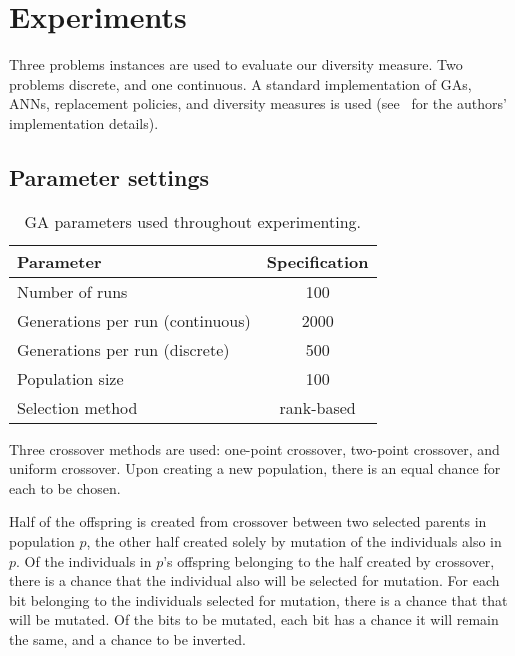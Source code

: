 \section{Experiments}
Three problems instances are used to evaluate our diversity measure. Two problems discrete, and one continuous. A standard implementation of GAs, ANNs, replacement policies, and diversity measures is used (see~\cite{mbm:kmc:ekoGA} for the authors' implementation details). 

\subsection{Parameter settings}

\begin{table}
  \centering
  \begin{tabular}{l S}
    \toprule
    Parameter & {Specification} \\
    \midrule
    Number of runs & 100 \\
    Generations per run (continuous) & 2000 \\
    Generations per run (discrete) & 500 \\
    Population size & 100 \\
    Selection method & {rank-based} \\
    \bottomrule
  \end{tabular}
  \caption{GA parameters used throughout experimenting.}
  \label{tab:gaparam}
\end{table}

Three crossover methods are used: one-point crossover, two-point crossover, and uniform crossover. Upon creating a new population, there is an equal chance for each to be chosen.

Half of the offspring is created from crossover between two selected parents in population $p$, the other half created solely by mutation of the individuals also in $p$. Of the individuals in $p$'s offspring belonging to the half created by crossover, there is a  chance that the individual also will be selected for mutation. For each bit belonging to the individuals selected for mutation, there is a  chance that that will be mutated. Of the bits to be mutated, each bit has a  chance it will remain the same, and a  chance to be inverted.




